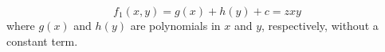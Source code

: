 \begin{proposition}\label{eq:183}
\[
    f_1(x,y)=g(x)+h(y)+c=zxy
\]
    where $g(x)$ and $h(y)$ are polynomials in $x$ and $y$, respectively, without a constant term.
\end{proposition}
